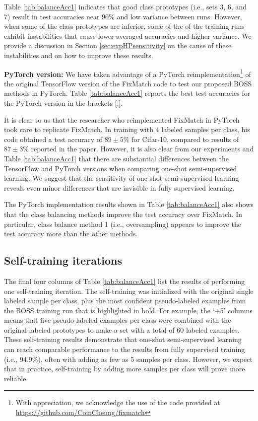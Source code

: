 \documentclass[final]{cvpr}
\newcommand{\OSSSL}{one-shot semi-supervised learning }
\newcommand{\OSSSLno}{one-shot semi-supervised learning}
\newcommand{\FM}{FixMatch }
\begin{document}
Table \ref{tab:balanceAcc1} indicates that good class prototypes (i.e., sets 3, 6, and 7) result in test accuracies near 90\% and low variance between runs.
However, when some of the class prototypes are inferior, some of the of the training runs exhibit instabilities that cause lower averaged accuracies and higher variance.
We provide a discussion in Section \ref{sec:expHPsensitivity} on the cause of these instabilities and on how to improve these results.


\textbf{PyTorch version:}
We have taken advantage of a PyTorch reimplementation\footnote{With appreciation, we acknowledge the use of the code provided at \url{https://github.com/CoinCheung/fixmatch} } of the original TensorFlow version of the \FM code to test our proposed BOSS methods in PyTorch.
Table \ref{tab:balanceAcc1} reports the best test accuracies for the PyTorch version in the brackets [.].

It is clear to us that the researcher who reimplemented FixMatch in PyTorch took care to replicate FixMatch.
In training with 4 labeled samples per class, his code obtained a test accuracy of $ 89 \pm 5\%$ for Cifar-10, compared to results of $ 87 \pm 3\% $ reported in the paper.
However, it is also clear from our experiments and Table \ref{tab:balanceAcc1} that there are substantial differences between the TensorFlow and PyTorch versions when comparing \OSSSLno.
We suggest that the sensitivity of \OSSSL reveals even minor differences that are invisible in fully supervised learning.

The PyTorch implementation results shown in Table \ref{tab:balanceAcc1} also shows that the class balancing methods improve the test accuracy over FixMatch.
In particular, class balance method 1 (i.e., oversampling) appears to improve the test accuracy more than the other methods.


\subsection{Self-training iterations}
\label{sec:expIter}

The final four columns of Table \ref{tab:balanceAcc1} list the results of performing one self-training iteration.
The self-training was initialized with the  original single labeled sample per class, plus  the most confident pseudo-labeled examples from the BOSS training run that is highlighted in bold.
For example, the `+5' columns means that five pseudo-labeled examples per class were combined with the original labeled prototypes to make a set with a total of 60 labeled examples.
These self-training results demonstrate that \OSSSL can reach comparable performance to the results from fully supervised training (i.e., 94.9\%), often with adding as few as 5 samples per class.
However, we expect that in practice, self-training by adding more samples per class will prove more reliable.
\end{document}
